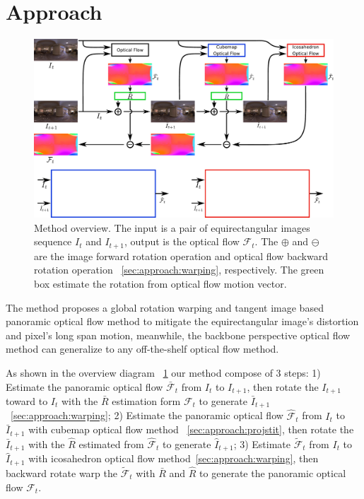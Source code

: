 \section{Approach}\label{sec:approach}

\begin{figure}[hbt!]
	\centering
	\includegraphics[width=0.95\linewidth]{images/method_pipeline_1.pdf}
	\caption{Method overview. The input is a pair of equirectangular images sequence $I_t$ and $I_{t+1}$, output is the optical flow $\mathcal{F}_t$. The $\oplus$ and  $\ominus$ are the image forward rotation operation and optical flow backward rotation operation ~\cref{sec:approach:warping}, respectively. The green box estimate the rotation from optical flow motion vector.}
	\label{fig:approach:pipeline}
\end{figure}

The method proposes a global rotation warping and tangent image based panoramic optical flow method to mitigate the equirectangular image's distortion and pixel's long span motion, meanwhile, the backbone perspective optical flow method can generalize to any  off-the-shelf optical flow method.

As shown in the overview diagram ~\cref{fig:approach:pipeline} our method compose of 3 steps:
1) Estimate the panoramic optical flow $\bar{\mathcal{F}}_t$ from $I_{t}$ to ${I_{t+1}}$, then rotate the $I_{t+1}$ toward to $I_{t}$ with the $\bar{R}$ estimation form $\mathcal{F}_t$ to generate ${\bar{I}}_{t+1}$~\cref{sec:approach:warping};
2) Estimate the panoramic optical flow ${\hat{\mathcal{F}}}_t$ from $I_{t}$ to ${\bar{I}}_{t+1}$ with cubemap optical flow method ~\cref{sec:approach:projstit}, then rotate the  ${\bar{I}}_{t+1}$ with the $\hat{R}$ estimated from ${\hat{\mathcal{F}}}_t$ to generate ${\hat{I}}_{t+1}$;
3) Estimate $\tilde{\mathcal{F}}_t$ from $I_{t}$ to ${\hat{I}}_{t+1}$ with icosahedron optical flow method~\cref{sec:approach:warping}, then backward rotate warp the $\tilde{\mathcal{F}}_t$ with $\bar{R}$ and $\hat{R}$ to generate the panoramic optical flow $\mathcal{F}_t$.


